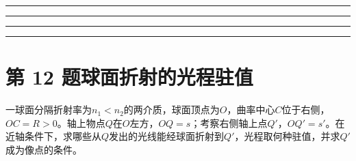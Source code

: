 \documentclass[UTF8,fontset=fandol,a4paper,11pt]{ctexart}
\newcommand{\workarea}{\par\vspace{7mm}\noindent{\small\color{muted}作答区}\par\vspace{4mm}
\noindent\textcolor{rulegray}{\rule{\linewidth}{0.3pt}}\par\vspace{16mm}
\noindent\textcolor{rulegray}{\rule{\linewidth}{0.3pt}}\par\vspace{16mm}
\noindent\textcolor{rulegray}{\rule{\linewidth}{0.3pt}}\par\vspace{16mm}
\noindent\textcolor{rulegray}{\rule{\linewidth}{0.3pt}}}
\begin{document}
\workarea

\clearpage


\section*{第 12 题\quad 球面折射的光程驻值}\label{q:12}

一球面分隔折射率为$n_1<n_2$的两介质，球面顶点为$O$，曲率中心$C$位于右侧，$OC=R>0$。轴上物点$Q$在$O$左方，$OQ=s$；考察右侧轴上点$Q'$，$OQ'=s'$。在近轴条件下，求哪些从$Q$发出的光线能经球面折射到$Q'$，光程取何种驻值，并求$Q'$成为像点的条件。

\begin{center}\begin{minipage}{.98\linewidth}\centering
{}
\end{minipage}
\end{center}
\end{document}
